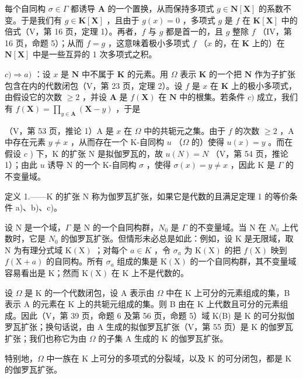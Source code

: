 每个自同构 \(\sigma \in \Gamma\) 都诱导 \(\mathbf{A}\) 的一个置换，从而保持多项式 \(g \in \mathbf{N}[\mathbf{X}]\) 的系数不变。于是我们有 \(g \in \mathbf{K}[\mathbf{X}]\) ，且由于 \(g(x) = 0\) ，多项式 \(g\) 是 \(f\) 在 \(\mathbf{K}[\mathbf{X}]\) 中的倍式（V，第 16 页，定理 1）。再者，\(f\) 与 \(g\) 都是首一的，且 \(g\) 整除 \(f\) （IV，第 16 页，命题 5）；从而 \(f = g\) ，这意味着极小多项式 \(f\) （\(x\) 的，在 \(\mathbf{K}\) 上的）在 \(\mathbf{N}[\mathbf{X}]\) 中是一些互异的 1 次多项式之积。

\(c) \Rightarrow a)\) ：设 \(x\) 是 \(\mathbf{N}\) 中不属于 \(\mathbf{K}\) 的元素。用 \(\Omega\) 表示 \(\mathbf{K}\) 的一个把 \(\mathbf{N}\) 作为子扩张包含在内的代数闭包（V，第 23 页，定理 2）。设 \(f\) 是 \(x\) 在 \(\mathbf{K}\) 上的极小多项式，由假设它的次数 \(\geqslant 2\) ，并设 \(\mathbf{A}\) 是 \(f(\mathbf{X})\) 在 \(\mathbf{N}\) 中的根集。若条件 \(c)\) 成立，我们有 \(f(\mathbf{X}) = \prod_{y \in \mathbf{A}} (\mathbf{X} - y)\) ，于是

（V，第 53 页，推论 1）A 是 \(x\) 在 \(\Omega\) 中的共轭元之集。由于 \(f\) 的次数 \(\geqslant 2\) ，A 中存在元素 \(y \neq x\) ，从而存在一个 K-自同构 \(u\) （\(\Omega\) 的）使得 \(u(x) = y\) 。而在假设 \(c\) ) 下，K 的扩张 N 是拟伽罗瓦的，故 \(u(N) = N\) （V，第 54 页，推论 1）；由此 \(u\) 诱导 N 的一个 K-自同构 \(\sigma\) ，使得 \(\sigma(x) = y \neq x\) ，因此 K 是 \(\Gamma\) 的不变量域。

定义 1.——K 的扩张 N 称为伽罗瓦扩张，如果它是代数的且满足定理 1 的等价条件 a)、b)、c)。

设 N 是一个域，\(\Gamma\) 是 N 的一个自同构群，\(N_{0}\) 是 \(\Gamma\) 的不变量域。当 N 在 \(N_{0}\) 上代数时，它是 \(N_{0}\) 的伽罗瓦扩张。但情形未必总是如此：例如，设 K 是无限域，取 N 为有理分式域 \(\mathrm{K}(\mathrm{X})\) ；对每个 \(a \in K\) ，令 \(\sigma_{a}\) 为 \(\mathrm{K}(\mathrm{X})\) 的把 \(f(\mathrm{X})\) 映到 \(f(\mathrm{X} + a)\) 的自同构。所有 \(\sigma_{a}\) 组成的集是 \(\mathrm{K}(\mathrm{X})\) 的一个自同构群，其不变量域容易看出是 K；然而 \(\mathrm{K}(\mathrm{X})\) 在 K 上不是代数的。

设 \(\Omega\) 是 K 的一个代数闭包，设 A 表示由 \(\Omega\) 中在 K 上可分的元素组成的集，B 表示 A 的元素在 K 上的共轭元组成的集。则 B 由在 K 上代数且可分的元素组成。因此（V，第 39 页，命题 6 及第 56 页，命题 5）域 K(B) 是 K 的可分拟伽罗瓦扩张；换句话说，由 A 生成的拟伽罗瓦扩张（V，第 55 页）是 K 的伽罗瓦扩张；我们也称它为由 \(\Omega\) 的子集 A 生成的 K 的伽罗瓦扩张。

特别地，\(\Omega\) 中一族在 K 上可分的多项式的分裂域，以及 K 的可分闭包，都是 K 的伽罗瓦扩张。

